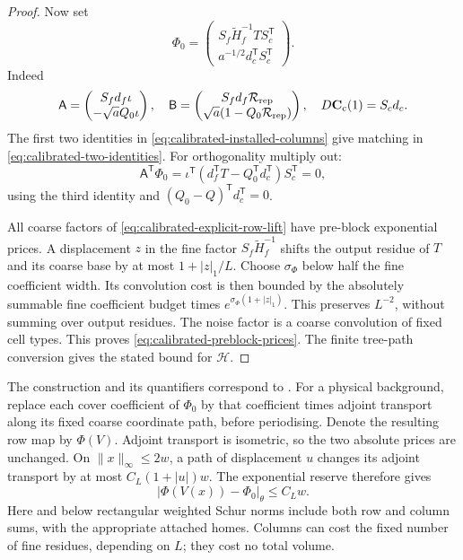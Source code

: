 \documentclass[11pt,reqno]{amsart}
\numberwithin{equation}{section}
\theoremstyle{definition}
\theoremstyle{remark}
\begin{document}
\begin{proof}
Now set
\begin{equation}
 \Phi_0=\begin{pmatrix}
    S_f\widetilde H_f^{-1}TS_c^{\mathsf T}\\[2pt]
    a^{-1/2}d_c^{\mathsf T}S_c^{\mathsf T}
 \end{pmatrix}.
 \label{eq:calibrated-explicit-row-lift}
\end{equation}
Indeed
\[
 \mathsf A=\begin{pmatrix}S_fd_f\iota\\-\sqrt a Q_0\iota\end{pmatrix},
 \quad
 \mathsf B=\begin{pmatrix}S_fd_f\mathcal R_{\rm rep}\\
              \sqrt a(1-Q_0\mathcal R_{\rm rep})\end{pmatrix},
 \quad D\mathbf C_{\rm c}(1)=S_cd_c.
\]
The first two identities in \eqref{eq:calibrated-installed-columns}
give matching in \eqref{eq:calibrated-two-identities}.
For orthogonality multiply out:
\[
 \mathsf A^{\mathsf T}\Phi_0
   =\iota^{\mathsf T}(d_f^{\mathsf T}T-Q_0^{\mathsf T}d_c^{\mathsf T})S_c^{\mathsf T}=0,
\]
using the third identity and \((Q_0-Q)^{\mathsf T}d_c^{\mathsf T}=0\).

All coarse factors of \eqref{eq:calibrated-explicit-row-lift}
have pre-block exponential prices. A displacement \(z\) in
the fine factor \(S_f\widetilde H_f^{-1}\) shifts the output
residue of \(T\) and its coarse base by at most
\(1+|z|_1/L\). Choose \(\sigma_\Phi\) below half the fine
coefficient width. Its convolution cost is then bounded by
the absolutely summable fine coefficient budget times
\(e^{\sigma_\Phi(1+|z|_1)}\).
This preserves \(L^{-2}\), without summing over output residues.
The noise factor is a coarse convolution of fixed cell types.
This proves \eqref{eq:calibrated-preblock-prices}.
The finite tree-path conversion gives the stated bound for
\(\mathcal H\).
\end{proof}

The construction and its quantifiers correspond to
\cite[Sections~20--22, pp.~100--114]{Main}.
For a physical background, replace each cover coefficient of
\(\Phi_0\) by that coefficient times adjoint transport along
its fixed coarse coordinate path, before periodising. Denote
the resulting row map by \(\Phi(V)\). Adjoint transport is
isometric, so the two absolute prices are unchanged.
On \(\|x\|_\infty\le2w\), a path of displacement \(u\)
changes its adjoint transport by at most
\(C_L(1+|u|)w\). The exponential reserve therefore gives
\begin{equation}
 |\Phi(V(x))-\Phi_0|_\theta\le C_Lw.
 \label{eq:calibrated-covariant-perturbation}
\end{equation}
Here and below rectangular weighted Schur norms include both
row and column sums, with the appropriate attached homes.
Columns can cost the fixed number of fine residues, depending
on \(L\); they cost no total volume.
\end{document}
